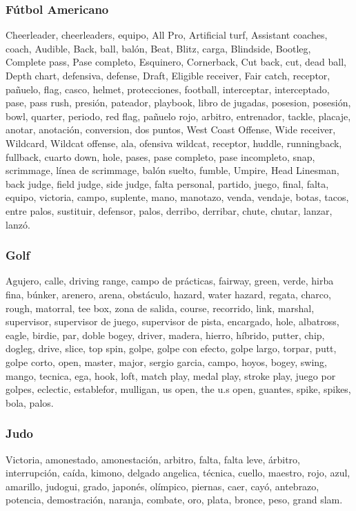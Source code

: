 \documentclass[../all.tex]{subfiles}
\begin{document}
    \subsubsection{Fútbol Americano}
    Cheerleader, cheerleaders, equipo, All Pro, Artificial turf, Assistant coaches, coach, Audible, Back, ball, balón, Beat, Blitz, carga, Blindside, Bootleg, Complete pass, Pase completo, Esquinero, Cornerback, Cut back, cut, dead ball, Depth chart, defensiva, defense, Draft, Eligible receiver, Fair catch, receptor, pañuelo, flag, casco, helmet, protecciones, football, interceptar, interceptado, pase, pass rush, presión, pateador, playbook, libro de jugadas, posesion, posesión, bowl, quarter, periodo, red flag, pañuelo rojo, arbitro, entrenador, tackle, placaje, anotar, anotación, conversion, dos puntos, West Coast Offense, Wide receiver, Wildcard, Wildcat offense, ala, ofensiva wildcat, receptor, huddle, runningback, fullback, cuarto down, hole, pases, pase completo, pase incompleto, snap, scrimmage, línea de scrimmage, balón suelto, fumble, Umpire, Head Linesman, back judge, field judge, side judge, falta personal, partido, juego, final, falta, equipo, victoria, campo, suplente, mano, manotazo, venda, vendaje, botas, tacos, entre palos, sustituir, defensor, palos, derribo, derribar, chute, chutar, lanzar, lanzó.
    \subsubsection{Golf}
    Agujero, calle, driving range, campo de prácticas, fairway, green, verde, hirba fina, búnker, arenero, arena, obstáculo, hazard, water hazard, regata, charco, rough, matorral, tee box, zona de salida, course, recorrido, link, marshal, supervisor, supervisor de juego, supervisor de pista, encargado, hole, albatross, eagle, birdie, par, doble bogey, driver, madera, hierro, híbrido, putter, chip, dogleg, drive, slice, top spin, golpe, golpe con efecto, golpe largo, torpar, putt, golpe corto, open, master, major, sergio garcia, campo, hoyos, bogey, swing, mango, tecnica, ega, hook, loft, match play, medal play, stroke play, juego por golpes, eclectic, establefor, mulligan, us open, the u.s open, guantes, spike, spikes, bola, palos.
    \subsubsection{Judo}
    Victoria, amonestado, amonestación, arbitro, falta, falta leve, árbitro, interrupción, caída, kimono, delgado angelica, técnica, cuello, maestro, rojo, azul, amarillo, judogui, grado, japonés, olímpico, piernas, caer, cayó, antebrazo, potencia, demostración, naranja, combate, oro, plata, bronce, peso, grand slam.
\end{document}
